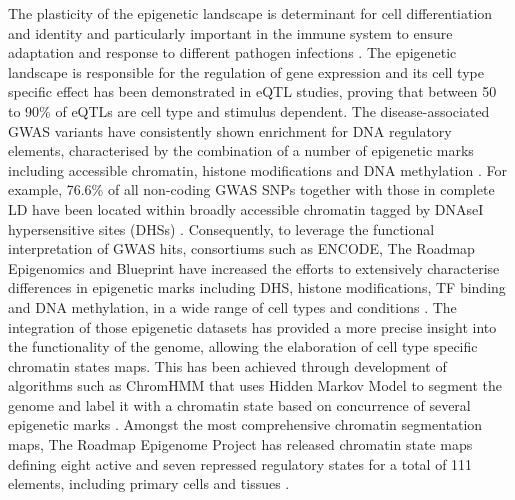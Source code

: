 The plasticity of the epigenetic landscape is determinant for cell differentiation and identity and particularly important in the immune system to ensure adaptation and response to different pathogen infections \parencite{Yosef2016}. The epigenetic landscape is responsible for the regulation of gene expression and its cell type specific effect has been demonstrated in eQTL studies, proving that between 50 to 90\% of eQTLs are cell type and stimulus dependent\parencite{Dimas2009,Nica2011,Fairfax2012,Fairfax2014,Raj2014,Naranbhai2015,Kasela2017}. 
The disease-associated GWAS variants have consistently shown enrichment for DNA regulatory elements, characterised by the combination of a number of epigenetic marks including accessible chromatin, histone modifications and DNA methylation . For example, 76.6\% of all non-coding GWAS SNPs together with those in complete LD have been located within broadly accessible chromatin tagged by DNAseI hypersensitive sites (DHSs) \parencite{Maurano2012}. 
Consequently, to leverage the functional interpretation of GWAS hits, consortiums such as ENCODE, The Roadmap Epigenomics and Blueprint have increased the efforts to extensively characterise differences in epigenetic marks including DHS, histone modifications, TF binding and DNA methylation, in a wide range of cell types and conditions \parencite{ENCODE2012,Bernstein2010,Adams2012}. 
The integration of those epigenetic datasets has provided a more precise insight into the functionality of the genome, allowing the elaboration of cell type specific chromatin states maps. This has been achieved through development of algorithms such as ChromHMM that uses Hidden Markov Model to segment the genome and label it with a chromatin state based on concurrence of several epigenetic marks \parencite{Ernst2010,Hoffman2012}. Amongst the most comprehensive chromatin segmentation maps, The Roadmap Epigenome Project has released chromatin state maps defining eight active and seven repressed regulatory states for a total of 111 elements, including primary cells and tissues \parencite{Kundaje2015, Ernst2011}. 

